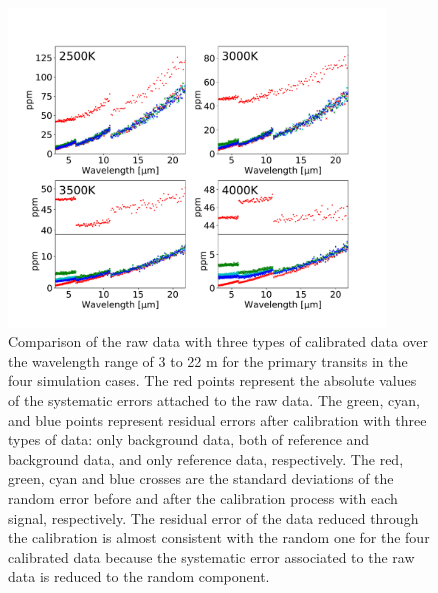\documentclass{aastex62}
\begin{document}
\begin{figure}[H]
\begin{center}
\includegraphics[width=10cm]{systematic_evaluation_primary.pdf}
\caption{Comparison of the raw data with three types of calibrated data over the wavelength range of 3 to 22 \textmu m for the primary transits in the four simulation cases. The red points represent the absolute values of the systematic errors attached to the raw data. The green, cyan, and blue points represent residual errors after calibration with three types of data: only background data, both of reference and background data, and only reference data, respectively. The red, green, cyan and blue crosses are the standard deviations of the random error before and after the calibration process with each signal, respectively. The residual error of the data reduced through the calibration is almost consistent with the random one for the four calibrated data because the systematic error associated to the raw data is reduced to the random component. \label{fig:evaluation_primary}}
\end{center}
\end{figure}
\end{document}
